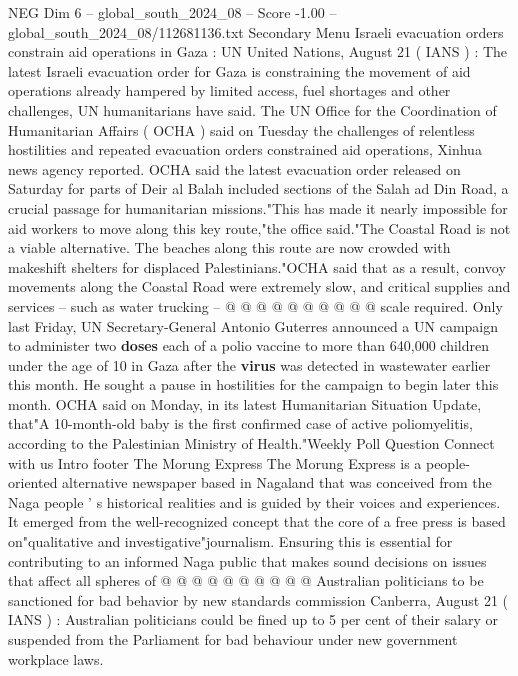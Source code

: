\begin{textsample}{NEG Dim 6 – global\_south\_2024\_08 – Score -1.00 – global\_south\_2024\_08/112681136.txt}  \label{ex:f6_neg_060}
Secondary Menu Israeli evacuation orders constrain aid operations in Gaza : UN United Nations, August 21 ( IANS ) : The latest Israeli evacuation order for Gaza is constraining the movement of aid operations already hampered by limited access, fuel shortages and other challenges, UN humanitarians have said.
The UN Office for the Coordination of Humanitarian Affairs ( OCHA ) said on Tuesday the challenges of relentless hostilities and repeated evacuation orders constrained aid operations, Xinhua news agency reported.
OCHA said the latest evacuation order released on Saturday for parts of Deir al Balah included sections of the Salah ad Din Road, a crucial passage for humanitarian missions."This has made it nearly impossible for aid workers to move along this key route,"the office said."The Coastal Road is not a viable alternative.
The beaches along this route are now crowded with makeshift shelters for displaced Palestinians."OCHA said that as a result, convoy movements along the Coastal Road were extremely slow, and critical supplies and services -- such as water trucking -- @ @ @ @ @ @ @ @ @ @ scale required.
Only last Friday, UN Secretary-General Antonio Guterres announced a UN campaign to administer two \textbf{doses} each of a polio vaccine to more than 640,000 children under the age of 10 in Gaza after the \textbf{virus} was detected in wastewater earlier this month.
He sought a pause in hostilities for the campaign to begin later this month.
OCHA said on Monday, in its latest Humanitarian Situation Update, that"A 10-month-old baby is the first confirmed case of active poliomyelitis, according to the Palestinian Ministry of Health."Weekly Poll Question Connect with us Intro footer The Morung Express The Morung Express is a people-oriented alternative newspaper based in Nagaland that was conceived from the Naga people ' s historical realities and is guided by their voices and experiences.
It emerged from the well-recognized concept that the core of a free press is based on"qualitative and investigative"journalism.
Ensuring this is essential for contributing to an informed Naga public that makes sound decisions on issues that affect all spheres of @ @ @ @ @ @ @ @ @ @ Australian politicians to be sanctioned for bad behavior by new standards commission Canberra, August 21 ( IANS ) : Australian politicians could be fined up to 5 per cent of their salary or suspended from the Parliament for bad behaviour under new government workplace laws.

\end{textsample}
